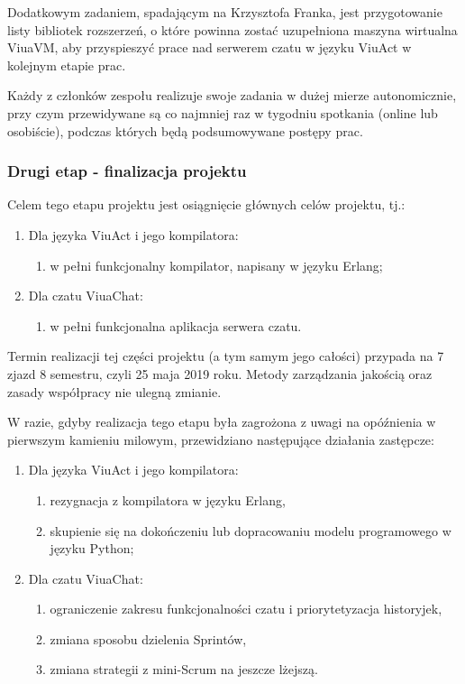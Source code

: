 \documentclass[11pt,oneside,a4paper,titlepage,onecolumn]{article}
\begin{document}
Dodatkowym zadaniem, spadającym na Krzysztofa Franka, jest przygotowanie listy bibliotek rozszerzeń, o które
powinna zostać uzupełniona maszyna wirtualna ViuaVM, aby przyspieszyć prace nad serwerem czatu w języku
ViuAct w kolejnym etapie prac.

Każdy z członków zespołu realizuje swoje zadania w dużej mierze autonomicznie, przy czym przewidywane są co
najmniej raz w tygodniu spotkania (online lub osobiście), podczas których będą podsumowywane postępy prac.

\subsubsection{Drugi etap - finalizacja projektu}

Celem tego etapu projektu jest osiągnięcie głównych celów projektu, tj.:
\begin{enumerate}
	\item Dla języka ViuAct i jego kompilatora:
		\begin{enumerate}
			\item w pełni funkcjonalny kompilator, napisany w języku Erlang;
		\end{enumerate}
	\item Dla czatu ViuaChat:
		\begin{enumerate}
			\item w pełni funkcjonalna aplikacja serwera czatu.
		\end{enumerate}
\end{enumerate}
Termin realizacji tej części projektu (a tym samym jego całości) przypada na 7 zjazd 8 semestru, czyli 25 
maja 2019 roku. Metody zarządzania jakością oraz zasady współpracy nie ulegną zmianie.

W razie, gdyby realizacja tego etapu była zagrożona z uwagi na opóźnienia w pierwszym kamieniu milowym,
przewidziano następujące działania zastępcze:

\begin{enumerate}
	\item Dla języka ViuAct i jego kompilatora:
		\begin{enumerate}
			\item rezygnacja z kompilatora w języku Erlang,
			\item skupienie się na dokończeniu lub dopracowaniu modelu programowego w języku Python;
		\end{enumerate}
	\item Dla czatu ViuaChat:
		\begin{enumerate}
			\item ograniczenie zakresu funkcjonalności czatu i priorytetyzacja historyjek,
			\item zmiana sposobu dzielenia Sprintów,
			\item zmiana strategii z mini-Scrum na jeszcze lżejszą.
		\end{enumerate}
\end{enumerate}
\end{document}
